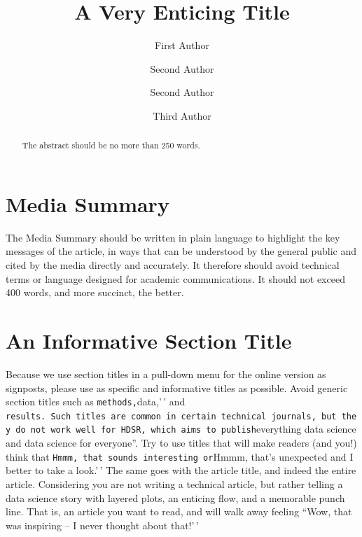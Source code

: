 \documentclass[
]{hdsr}
\title{A Very Enticing Title}
\author{First Author \and Second Author \and Second Author \and Third
Author}
\date{}
\begin{document}
\maketitle
\begin{abstract}
The abstract should be no more than 250 words.
\end{abstract}
\ifdefined\Shaded\renewenvironment{Shaded}{\begin{tcolorbox}[breakable, frame hidden, boxrule=0pt, enhanced, sharp corners, borderline west={3pt}{0pt}{shadecolor}, interior hidden]}{\end{tcolorbox}}\fi

\hypertarget{media-summary}{%
\section*{Media Summary}\label{media-summary}}

The Media Summary should be written in plain language to highlight the
key messages of the article, in ways that can be understood by the
general public and cited by the media directly and accurately. It
therefore should avoid technical terms or language designed for academic
communications. It should not exceed 400 words, and more succinct, the
better.

\hypertarget{sec-sec1}{%
\section{An Informative Section Title}\label{sec-sec1}}

Because we use section titles in a pull-down menu for the online version
as signposts, please use as specific and informative titles as possible.
Avoid generic section titles such as
\texttt{methods,\textquotesingle{}\textquotesingle{}}data,'\,' and
\texttt{results\textquotesingle{}\textquotesingle{}.\ Such\ titles\ are\ common\ in\ certain\ technical\ journals,\ but\ they\ do\ not\ work\ well\ for\ HDSR,\ which\ aims\ to\ publish}everything
data science and data science for everyone''. Try to use titles that
will make readers (and you!) think that
\texttt{Hmmm,\ that\ sounds\ interesting\textquotesingle{}\textquotesingle{}\ or}Hmmm,
that's unexpected and I better to take a look.'\,' The same goes with
the article title, and indeed the entire article. Considering you are
not writing a technical article, but rather telling a data science story
with layered plots, an enticing flow, and a memorable punch line. That
is, an article you want to read, and will walk away feeling ``Wow, that
was inspiring -- I never thought about that!'\,'
\end{document}
